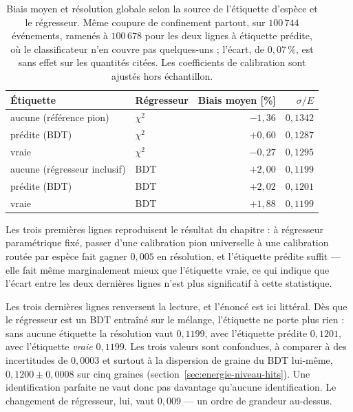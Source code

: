 \begin{table}[!ht]
\centering
\caption{Biais moyen et résolution globale selon la source de l'étiquette d'espèce et le régresseur. Même coupure de confinement partout, sur $100\,744$ événements, ramenés à $100\,678$ pour les deux lignes à étiquette prédite, où le classificateur n'en couvre pas quelques-uns ; l'écart, de $0{,}07\,\%$, est sans effet sur les quantités citées. Les coefficients de calibration sont ajustés hors échantillon.}
\label{tab:coupling_revision}
\small
\begin{tabular}{llrr}
\toprule
Étiquette & Régresseur & Biais moyen [\%] & $\sigma/E$ \\
\midrule
aucune (référence pion) & $\chi^2$ & $-1{,}36$ & $0{,}1342$ \\
prédite (BDT)           & $\chi^2$ & $+0{,}60$ & $0{,}1287$ \\
vraie                   & $\chi^2$ & $-0{,}27$ & $0{,}1295$ \\
\midrule
aucune (régresseur inclusif) & BDT & $+2{,}00$ & $0{,}1199$ \\
prédite (BDT)           & BDT      & $+2{,}02$ & $0{,}1201$ \\
vraie                   & BDT      & $+1{,}88$ & $0{,}1199$ \\
\bottomrule
\end{tabular}
\end{table}

Les trois premières lignes reproduisent le résultat du chapitre : à régresseur paramétrique fixé, passer d'une calibration pion universelle à une calibration routée par espèce fait gagner $0{,}005$ en résolution, et l'étiquette prédite suffit — elle fait même marginalement mieux que l'étiquette vraie, ce qui indique que l'écart entre les deux dernières lignes n'est plus significatif à cette statistique.

Les trois dernières lignes renversent la lecture, et l'énoncé est ici littéral. Dès que le régresseur est un BDT entraîné sur le mélange, l'étiquette ne porte plus rien : sans aucune étiquette la résolution vaut $0{,}1199$, avec l'étiquette prédite $0{,}1201$, avec l'étiquette \emph{vraie} $0{,}1199$. Les trois valeurs sont confondues, à comparer à des incertitudes de $0{,}0003$ et surtout à la dispersion de graine du BDT lui-même, $0{,}1200 \pm 0{,}0008$ sur cinq graines (section~\ref{sec:energie-niveau-hits}). Une identification parfaite ne vaut donc pas davantage qu'aucune identification. Le changement de régresseur, lui, vaut $0{,}009$ — un ordre de grandeur au-dessus.


